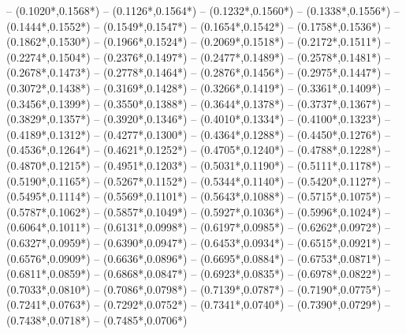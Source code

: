 {	-- ({0.1020*\dx},{0.1568*\dy})
	-- ({0.1126*\dx},{0.1564*\dy})
	-- ({0.1232*\dx},{0.1560*\dy})
	-- ({0.1338*\dx},{0.1556*\dy})
	-- ({0.1444*\dx},{0.1552*\dy})
	-- ({0.1549*\dx},{0.1547*\dy})
	-- ({0.1654*\dx},{0.1542*\dy})
	-- ({0.1758*\dx},{0.1536*\dy})
	-- ({0.1862*\dx},{0.1530*\dy})
	-- ({0.1966*\dx},{0.1524*\dy})
	-- ({0.2069*\dx},{0.1518*\dy})
	-- ({0.2172*\dx},{0.1511*\dy})
	-- ({0.2274*\dx},{0.1504*\dy})
	-- ({0.2376*\dx},{0.1497*\dy})
	-- ({0.2477*\dx},{0.1489*\dy})
	-- ({0.2578*\dx},{0.1481*\dy})
	-- ({0.2678*\dx},{0.1473*\dy})
	-- ({0.2778*\dx},{0.1464*\dy})
	-- ({0.2876*\dx},{0.1456*\dy})
	-- ({0.2975*\dx},{0.1447*\dy})
	-- ({0.3072*\dx},{0.1438*\dy})
	-- ({0.3169*\dx},{0.1428*\dy})
	-- ({0.3266*\dx},{0.1419*\dy})
	-- ({0.3361*\dx},{0.1409*\dy})
	-- ({0.3456*\dx},{0.1399*\dy})
	-- ({0.3550*\dx},{0.1388*\dy})
	-- ({0.3644*\dx},{0.1378*\dy})
	-- ({0.3737*\dx},{0.1367*\dy})
	-- ({0.3829*\dx},{0.1357*\dy})
	-- ({0.3920*\dx},{0.1346*\dy})
	-- ({0.4010*\dx},{0.1334*\dy})
	-- ({0.4100*\dx},{0.1323*\dy})
	-- ({0.4189*\dx},{0.1312*\dy})
	-- ({0.4277*\dx},{0.1300*\dy})
	-- ({0.4364*\dx},{0.1288*\dy})
	-- ({0.4450*\dx},{0.1276*\dy})
	-- ({0.4536*\dx},{0.1264*\dy})
	-- ({0.4621*\dx},{0.1252*\dy})
	-- ({0.4705*\dx},{0.1240*\dy})
	-- ({0.4788*\dx},{0.1228*\dy})
	-- ({0.4870*\dx},{0.1215*\dy})
	-- ({0.4951*\dx},{0.1203*\dy})
	-- ({0.5031*\dx},{0.1190*\dy})
	-- ({0.5111*\dx},{0.1178*\dy})
	-- ({0.5190*\dx},{0.1165*\dy})
	-- ({0.5267*\dx},{0.1152*\dy})
	-- ({0.5344*\dx},{0.1140*\dy})
	-- ({0.5420*\dx},{0.1127*\dy})
	-- ({0.5495*\dx},{0.1114*\dy})
	-- ({0.5569*\dx},{0.1101*\dy})
	-- ({0.5643*\dx},{0.1088*\dy})
	-- ({0.5715*\dx},{0.1075*\dy})
	-- ({0.5787*\dx},{0.1062*\dy})
	-- ({0.5857*\dx},{0.1049*\dy})
	-- ({0.5927*\dx},{0.1036*\dy})
	-- ({0.5996*\dx},{0.1024*\dy})
	-- ({0.6064*\dx},{0.1011*\dy})
	-- ({0.6131*\dx},{0.0998*\dy})
	-- ({0.6197*\dx},{0.0985*\dy})
	-- ({0.6262*\dx},{0.0972*\dy})
	-- ({0.6327*\dx},{0.0959*\dy})
	-- ({0.6390*\dx},{0.0947*\dy})
	-- ({0.6453*\dx},{0.0934*\dy})
	-- ({0.6515*\dx},{0.0921*\dy})
	-- ({0.6576*\dx},{0.0909*\dy})
	-- ({0.6636*\dx},{0.0896*\dy})
	-- ({0.6695*\dx},{0.0884*\dy})
	-- ({0.6753*\dx},{0.0871*\dy})
	-- ({0.6811*\dx},{0.0859*\dy})
	-- ({0.6868*\dx},{0.0847*\dy})
	-- ({0.6923*\dx},{0.0835*\dy})
	-- ({0.6978*\dx},{0.0822*\dy})
	-- ({0.7033*\dx},{0.0810*\dy})
	-- ({0.7086*\dx},{0.0798*\dy})
	-- ({0.7139*\dx},{0.0787*\dy})
	-- ({0.7190*\dx},{0.0775*\dy})
	-- ({0.7241*\dx},{0.0763*\dy})
	-- ({0.7292*\dx},{0.0752*\dy})
	-- ({0.7341*\dx},{0.0740*\dy})
	-- ({0.7390*\dx},{0.0729*\dy})
	-- ({0.7438*\dx},{0.0718*\dy})
	-- ({0.7485*\dx},{0.0706*\dy})
}
